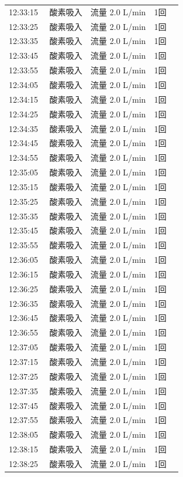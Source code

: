 \documentclass[UTF8,10pt,a4paper,fontset=fandol]{ctexart}
\begin{document}
\begin{minipage}[t]{0.48\linewidth}
\begin{tabular}{@{}p{0.22\linewidth}p{0.72\linewidth}@{}}
12:33:15 & 酸素吸入　流量 2.0 L/min　1回\\
12:33:25 & 酸素吸入　流量 2.0 L/min　1回\\
12:33:35 & 酸素吸入　流量 2.0 L/min　1回\\
12:33:45 & 酸素吸入　流量 2.0 L/min　1回\\
12:33:55 & 酸素吸入　流量 2.0 L/min　1回\\
12:34:05 & 酸素吸入　流量 2.0 L/min　1回\\
12:34:15 & 酸素吸入　流量 2.0 L/min　1回\\
12:34:25 & 酸素吸入　流量 2.0 L/min　1回\\
12:34:35 & 酸素吸入　流量 2.0 L/min　1回\\
12:34:45 & 酸素吸入　流量 2.0 L/min　1回\\
12:34:55 & 酸素吸入　流量 2.0 L/min　1回\\
12:35:05 & 酸素吸入　流量 2.0 L/min　1回\\
12:35:15 & 酸素吸入　流量 2.0 L/min　1回\\
12:35:25 & 酸素吸入　流量 2.0 L/min　1回\\
12:35:35 & 酸素吸入　流量 2.0 L/min　1回\\
12:35:45 & 酸素吸入　流量 2.0 L/min　1回\\
12:35:55 & 酸素吸入　流量 2.0 L/min　1回\\
12:36:05 & 酸素吸入　流量 2.0 L/min　1回\\
12:36:15 & 酸素吸入　流量 2.0 L/min　1回\\
12:36:25 & 酸素吸入　流量 2.0 L/min　1回\\
12:36:35 & 酸素吸入　流量 2.0 L/min　1回\\
12:36:45 & 酸素吸入　流量 2.0 L/min　1回\\
12:36:55 & 酸素吸入　流量 2.0 L/min　1回\\
12:37:05 & 酸素吸入　流量 2.0 L/min　1回\\
12:37:15 & 酸素吸入　流量 2.0 L/min　1回\\
12:37:25 & 酸素吸入　流量 2.0 L/min　1回\\
12:37:35 & 酸素吸入　流量 2.0 L/min　1回\\
12:37:45 & 酸素吸入　流量 2.0 L/min　1回\\
12:37:55 & 酸素吸入　流量 2.0 L/min　1回\\
12:38:05 & 酸素吸入　流量 2.0 L/min　1回\\
12:38:15 & 酸素吸入　流量 2.0 L/min　1回\\
12:38:25 & 酸素吸入　流量 2.0 L/min　1回\\

\end{tabular}
\end{minipage}
\end{document}
